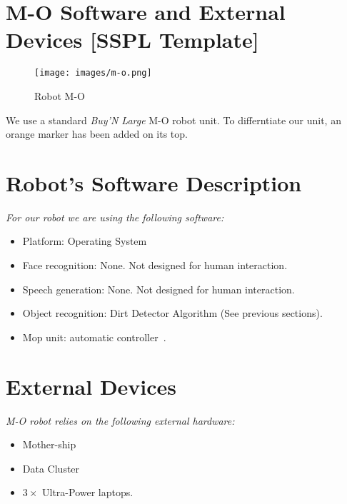 
\section*{M-O Software and External Devices [SSPL Template]}%
\label{sec:annex-SSPL}

\setlength\intextsep{0pt}
\begin{wrapfigure}[10]{r}{0.3\textwidth}
	\centering
	\texttt{[image: images/m-o.png]}
	\caption{Robot M-O}%
	\label{fig:m-o}
\end{wrapfigure}

We use a standard \textit{Buy'N Large} M-O robot unit. To differntiate our unit, an orange marker has been added on its top.

\section*{Robot's Software Description}

\textit{For our robot we are using the following software:}

\begin{itemize}
	\item Platform: \BnL{} Operating System
	\item Face recognition: None. Not designed for human interaction.
	\item Speech generation: None. Not designed for human interaction.
	\item Object recognition: \BnL{} Dirt Detector Algorithm (See previous sections).
	\item Mop unit: \BnL{} automatic controller~\cite{bnl2}.
\end{itemize}

\section*{External Devices}

\textit{M-O robot relies on the following external hardware:}

\begin{itemize}
	\item \BnL{} Mother-ship
	\item \BnL{} Data Cluster
	\item $3 \times$ \BnL{} Ultra-Power laptops.
\end{itemize}

